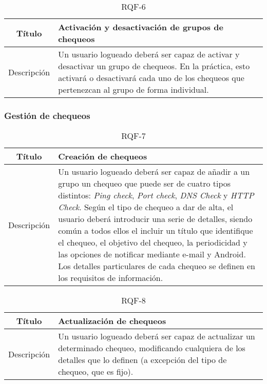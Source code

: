 \begin{table}[h!]
  \centering
  \begin{tabularx}{\textwidth}{|c|X|}
    \hline
    Título & Activación y desactivación de grupos de chequeos \\

    \hline

    Descripción & Un usuario logueado deberá ser capaz de activar y desactivar
    un grupo de chequeos. En la práctica, esto activará o desactivará cada uno
    de los chequeos que pertenezcan al grupo de forma individual. \\

    \hline
  \end{tabularx}
  \caption{RQF-6}
\end{table}

\FloatBarrier
\subsubsection{Gestión de chequeos}

\begin{table}[h!]
  \centering
  \begin{tabularx}{\textwidth}{|c|X|}
    \hline
    Título & Creación de chequeos \\

    \hline

    Descripción & Un usuario logueado deberá ser capaz de añadir a un grupo un
    chequeo que puede ser de cuatro tipos distintos: \textit{Ping check},
    \textit{Port check}, \textit{DNS Check} y \textit{HTTP Check}. Según el tipo
    de chequeo a dar de alta, el usuario deberá introducir una serie de
    detalles, siendo común a todos ellos el incluir un título que identifique el
    chequeo, el objetivo del chequeo, la periodicidad y las opciones de
    notificar mediante e-mail y Android.  Los detalles particulares de cada
    chequeo se definen en los
    requisitos de información. \\

    \hline
  \end{tabularx}
  \caption{RQF-7}
\end{table}


\begin{table}[h!]
  \centering
  \begin{tabularx}{\textwidth}{|c|X|}
    \hline
    Título & Actualización de chequeos \\

    \hline

    Descripción & Un usuario logueado deberá ser capaz de actualizar un
    determinado chequeo, modificando cualquiera de los detalles que lo definen
    (a excepción del tipo de chequeo, que es fijo). \\

    \hline
  \end{tabularx}
  \caption{RQF-8}
\end{table}

